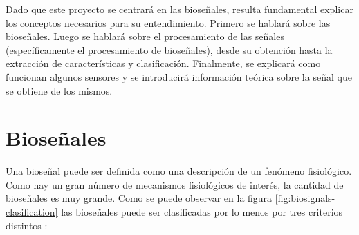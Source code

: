 Dado que este proyecto se centrará en las bioseñales, resulta fundamental explicar los conceptos necesarios para su entendimiento. Primero se hablará sobre las bioseñales. Luego se hablará sobre el procesamiento de las señales (específicamente el procesamiento de bioseñales), desde su obtención hasta la extracción de características y clasificación. Finalmente, se explicará como funcionan algunos sensores y se introducirá información teórica sobre la señal que se obtiene de los mismos.

\section{Bioseñales}\label{sec:biosignals}

Una bioseñal puede ser definida como una descripción de un fenómeno fisiológico. Como hay un gran número de mecanismos fisiológicos de interés, la cantidad de bioseñales es muy grande. Como se puede observar en la figura \ref{fig:biosignals-clasification} las bioseñales puede ser clasificadas por lo menos por tres criterios distintos \cite{biosignal-book-2}: 

